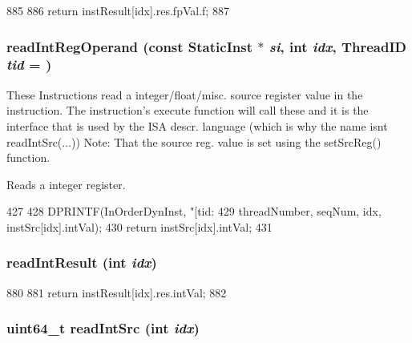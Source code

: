 \begin{DoxyCode}
885     {
886        return instResult[idx].res.fpVal.f;
887     }
\end{DoxyCode}
\hypertarget{classInOrderDynInst_a3fc2b67b903ef16132627604a1564938}{
\subsubsection[{readIntRegOperand}]{ readIntRegOperand (const {\bf StaticInst} $\ast$ {\em si}, \/  int {\em idx}, \/  {\bf ThreadID} {\em tid} = {})}}
\label{classInOrderDynInst_a3fc2b67b903ef16132627604a1564938}
These Instructions read a integer/float/misc. source register value in the instruction. The instruction's execute function will call these and it is the interface that is used by the ISA descr. language (which is why the name isnt readIntSrc(...)) Note: That the source reg. value is set using the setSrcReg() function.

Reads a integer register. 


\begin{DoxyCode}
427 {
428     DPRINTF(InOrderDynInst, "[tid:%
429             threadNumber, seqNum, idx, instSrc[idx].intVal);
430     return instSrc[idx].intVal;
431 }
\end{DoxyCode}
\hypertarget{classInOrderDynInst_ae4e4227a87d6a0625e0870c0072a3122}{
\subsubsection[{readIntResult}]{ readIntResult (int {\em idx})}}
\label{classInOrderDynInst_ae4e4227a87d6a0625e0870c0072a3122}



\begin{DoxyCode}
880     {
881         return instResult[idx].res.intVal;
882     }
\end{DoxyCode}
\hypertarget{classInOrderDynInst_a7d7601b697b7124a589fa6fed48d6fc5}{
\subsubsection[{readIntSrc}]{\setlength{\rightskip}{0pt plus 5cm}uint64\_\-t readIntSrc (int {\em idx})}}
\label{classInOrderDynInst_a7d7601b697b7124a589fa6fed48d6fc5}



